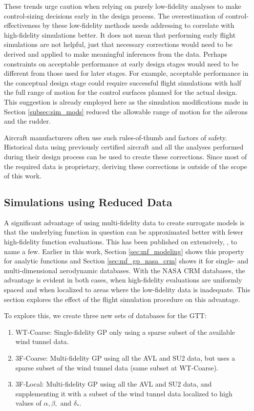 These trends urge caution when relying on purely low-fidelity analyses to make control-sizing decisions early in the design process.
The overestimation of control-effectiveness by these low-fidelity methods needs addressing to correlate with high-fidelity simulations better. 
It does not mean that performing early flight simulations are not helpful, just that necessary corrections would need to be derived and applied to make meaningful inferences from the data. 
Perhaps constraints on acceptable performance at early design stages would need to be different from those used for later stages. 
For example, acceptable performance in the conceptual design stage could require successful flight simulations with half the full range of motion for the control surfaces planned for the actual design.
This suggestion is already employed here as the simulation modifications made in Section \ref{subsec:sim_mods} reduced the allowable range of motion for the ailerons and the rudder. 

Aircraft manufacturers often use such rules-of-thumb and factors of safety.
Historical data using previously certified aircraft and all the analyses performed during their design process can be used to create these corrections. 
Since most of the required data is proprietary, deriving these corrections is outside of the scope of this work. 

\subsection{Simulations using Reduced Data}

A significant advantage of using multi-fidelity data to create surrogate models is that the underlying function in question can be approximated better with fewer high-fidelity function evaluations.
This has been published on extensively, \cite{kennedy_predicting_2000,gratiet_multi-fidelity_nodate,perdikaris_multi-fidelity_2015, ghoreishi_gaussian_2018}, to name a few. 
Earlier in this work, Section \ref{sec:mf_modeling} shows this property for analytic functions and Section \ref{sec:mf_gp_nasa_crm} shows it for single- and multi-dimensional aerodynamic databases.
With the NASA CRM databases, the advantage is evident in both cases, when high-fidelity evaluations are uniformly spaced and when localized to areas where the low-fidelity data is inadequate. 
This section explores the effect of the flight simulation procedure on this advantage.

To explore this, we create three new sets of databases for the GTT:
\begin{enumerate}
    \item WT-Coarse: Single-fidelity GP only using a sparse subset of the available wind tunnel data.
    \item 3F-Coarse: Multi-fidelity GP using all the AVL and SU2 data, but uses a sparse subset of the wind tunnel data (same subset at WT-Coarse).
    \item 3F-Local: Multi-fidelity GP  using all the AVL and SU2 data, and supplementing it with a subset of the wind tunnel data localized to high values of $\alpha, \beta,$ and $\delta_*$.
\end{enumerate}


